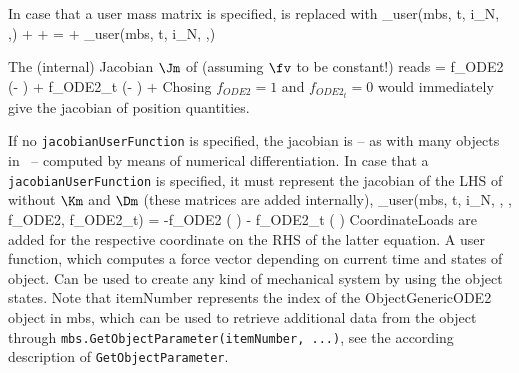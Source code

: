     In case that a user mass matrix is specified,  is replaced with
    \be
      \Mm_{user}(mbs, t, i_N, \qv,\dot \qv) \ddot \qv + \Dm \dot \qv + \Km \qv = \fv + \fv_{user}(mbs, t, i_N, \qv,\dot \qv)
    \ee

    The (internal) Jacobian $\Jm$ of  (assuming $\fv$ to be constant!) reads
    \be
      \Jm = f_{ODE2}   \left(\Km - \right) + 
            f_{ODE2_t} \left(\Dm -  \right) + 
    \ee
    Chosing $f_{ODE2} = 1$ and $f_{ODE2_t}=0$ would immediately give the jacobian of position quantities.
    
    If no \texttt{jacobianUserFunction} is specified, the jacobian is -- as with many objects in \codeName\ -- computed 
    by means of numerical differentiation.
    In case that a \texttt{jacobianUserFunction} is specified, it must represent the jacobian of the \ac{LHS} of  
    without $\Km$ and $\Dm$ (these matrices are added internally),
    \be \label{eq_ObjectGenericODE2_Jac}
      \Jm_{user}(mbs, t, i_N, \qv, \dot \qv, f_{ODE2}, f_{ODE2_t}) =
            -f_{ODE2}   \left( \right) - 
             f_{ODE2_t} \left( \right)
    \ee
    CoordinateLoads are added for the respective  coordinate on the RHS of the latter equation.
    A user function, which computes a force vector depending on current time and states of object. Can be used to create any kind of mechanical system by using the object states.
    Note that itemNumber represents the index of the ObjectGenericODE2 object in mbs, which can be used to retrieve additional data from the object through
    \texttt{mbs.GetObjectParameter(itemNumber, ...)}, see the according description of \texttt{GetObjectParameter}.
